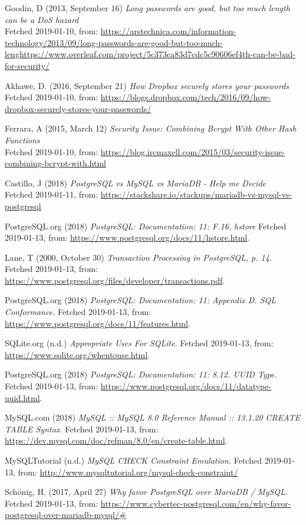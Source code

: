 \documentclass[12pt,a4paper]{report}
\begin{document}
{\begin{thebibliography}{1}
Goodin, D (2013, September 16) {\em Long passwords are good, but too much length can be a DoS hazard} \\
Fetched 2019-01-10, from:
\url{https://arstechnica.com/information-technology/2013/09/long-passwords-are-good-but-too-much-lenghttps://www.overleaf.com/project/5c373ca83d7cdc5c90606ef4th-can-be-bad-for-security/}

Akhawe, D. (2016, September 21) {\em How Dropbox securely stores your passwords} \\
Fetched 2019-01-10, from:
\url{https://blogs.dropbox.com/tech/2016/09/how-dropbox-securely-stores-your-passwords/}

Ferrara, A (2015, March 12) {\em Security Issue: Combining Bcrypt With Other Hash Functions} \\
Fetched 2019-01-10, from:
\url{https://blog.ircmaxell.com/2015/03/security-issue-combining-bcrypt-with.html}

Castillo, J (2018) {\em PostgreSQL vs MySQL vs MariaDB - Help me Decide} \\
Fetched 2019-01-11, from:
\url{https://stackshare.io/stackups/mariadb-vs-mysql-vs-postgresql}

PostgreSQL.org (2018) {\em PostgreSQL: Documentation: 11: F.16. hstore} Fetched 2019-01-13, from: \url{https://www.postgresql.org/docs/11/hstore.html}.

Lane, T (2000, October 30) {\em Transaction Processing in PostgreSQL, p. 14.} Fetched 2019-01-13, from: \url{https://www.postgresql.org/files/developer/transactions.pdf}.

PostgreSQL.org (2018) {\em PostgreSQL: Documentation: 11: Appendix D. SQL Conformance.} Fetched 2019-01-13, from: \url{https://www.postgresql.org/docs/11/features.html}.

SQLite.org (n.d.) {\em Appropriate Uses For SQLite.} Fetched 2019-01-13, from: \url{https://www.sqlite.org/whentouse.html}.

PostgreSQL.org (2018) {\em PostgreSQL: Documentation: 11: 8.12. UUID Type.} Fetched 2019-01-13, from: \url{https://www.postgresql.org/docs/11/datatype-uuid.html}.

MySQL.com (2018) {\em MySQL :: MySQL 8.0 Reference Manual :: 13.1.20 CREATE TABLE Syntax.} Fetched 2019-01-13, from: \url{https://dev.mysql.com/doc/refman/8.0/en/create-table.html}.

MySQLTutorial (n.d.) {\em MySQL CHECK Constraint Emulation.} Fetched 2019-01-13, from: \url{http://www.mysqltutorial.org/mysql-check-constraint/}

Schönig, H. (2017, April 27) {\em Why favor PostgreSQL over MariaDB / MySQL.} Fetched 2019-01-13, from:  \url{https://www.cybertec-postgresql.com/en/why-favor-postgresql-over-mariadb-mysql/#}

\end{thebibliography}}
\end{document}
